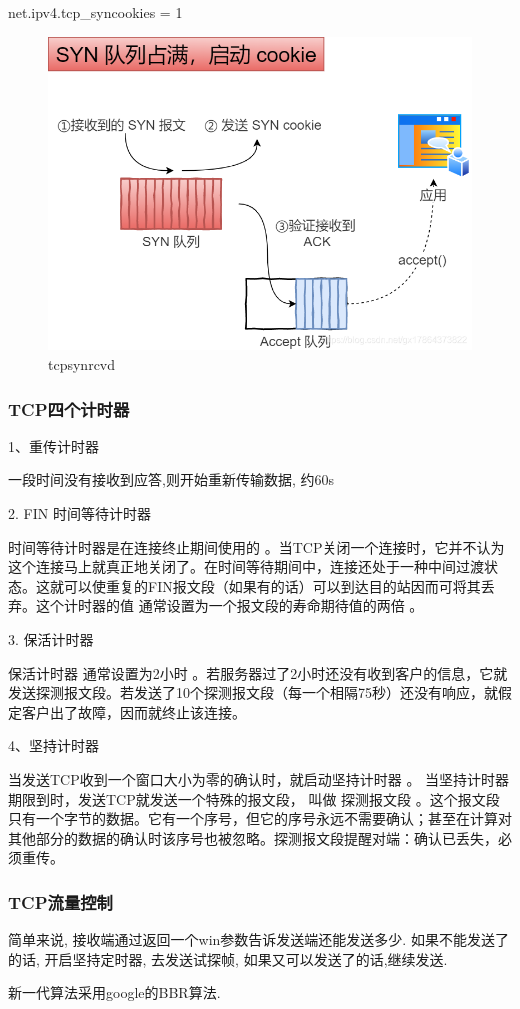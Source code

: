 net.ipv4.tcp\_syncookies = 1
\begin{figure}
	\centering
	\includegraphics[width=0.7\linewidth]{figures/tcpsynrcvd.png}
	\caption{tcpsynrcvd}
	\label{fig:tcpsynrcvd}
\end{figure}
\subsubsection{TCP四个计时器}
1、重传计时器

一段时间没有接收到应答,则开始重新传输数据, 约60s

2. FIN 时间等待计时器

时间等待计时器是在连接终止期间使用的 。当TCP关闭一个连接时，它并不认为这个连接马上就真正地关闭了。在时间等待期间中，连接还处于一种中间过渡状态。这就可以使重复的FIN报文段（如果有的话）可以到达目的站因而可将其丢弃。这个计时器的值 通常设置为一个报文段的寿命期待值的两倍 。

3. 保活计时器

保活计时器 通常设置为2小时 。若服务器过了2小时还没有收到客户的信息，它就发送探测报文段。若发送了10个探测报文段（每一个相隔75秒）还没有响应，就假定客户出了故障，因而就终止该连接。

4、坚持计时器

当发送TCP收到一个窗口大小为零的确认时，就启动坚持计时器 。 当坚持计时器期限到时，发送TCP就发送一个特殊的报文段， 叫做 探测报文段 。这个报文段只有一个字节的数据。它有一个序号，但它的序号永远不需要确认；甚至在计算对其他部分的数据的确认时该序号也被忽略。探测报文段提醒对端：确认已丢失，必须重传。
\subsubsection{TCP流量控制}
简单来说, 接收端通过返回一个win参数告诉发送端还能发送多少. 如果不能发送了的话, 开启坚持定时器, 去发送试探帧, 如果又可以发送了的话,继续发送. \par
新一代算法采用google的BBR算法.

